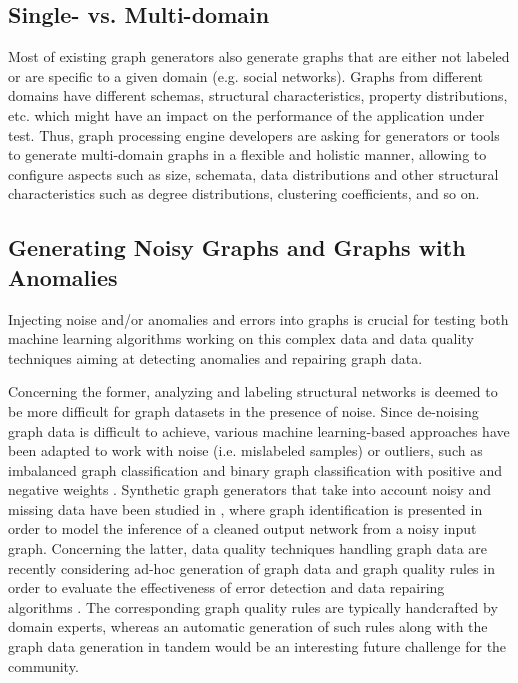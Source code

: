 \subsection{Single- vs. Multi-domain}

Most of existing graph generators also generate graphs that are either not labeled or
are specific to a given domain (e.g.  social networks). Graphs from different
domains have different schemas, structural characteristics, property
distributions, etc. which might have an impact on the performance of the
application under test. Thus, graph processing engine developers are asking for
generators or tools to generate multi-domain graphs  in a flexible and holistic manner, allowing to configure aspects
such as size, schemata, data distributions and other structural
characteristics such as degree distributions, clustering coefficients, and
so on.

\subsection{Generating Noisy Graphs and Graphs with Anomalies}
Injecting noise and/or anomalies and errors into graphs is crucial for
testing both machine learning algorithms working on this complex data and
data quality techniques aiming at detecting anomalies and repairing graph
data.

Concerning the former, analyzing and labeling structural networks is
deemed to be more difficult for graph datasets in the presence of noise.
Since de-noising graph data is difficult to achieve, various machine learning-based
approaches have been adapted to work with noise (i.e. mislabeled
samples) or outliers, such as
imbalanced graph classification \cite{PanZ13} and
binary graph classification with positive and negative weights \cite{CheungSML16}.
Synthetic graph generators that take into account noisy and missing data
have been studied in \cite{NamataG10}, where graph identification is presented in
order to  model the inference of a cleaned output network from a
noisy input graph.
Concerning the latter, data quality techniques handling graph data are recently considering ad-hoc
generation of graph data and graph quality rules in order to evaluate the
effectiveness of error detection and data repairing algorithms \cite{FanWX16a,AriouaB18}. The
corresponding graph quality rules are typically handcrafted by domain
experts, whereas an automatic generation of such rules along with the graph
data generation in tandem would be an interesting future challenge for the
community.

